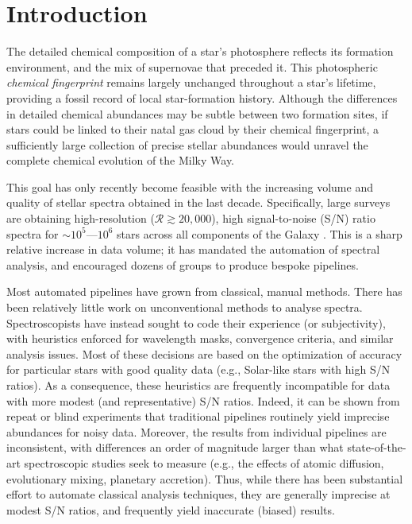 \documentclass[12pt,preprint]{aastex}
\begin{document}
\section{Introduction}
The detailed chemical composition of a star's photosphere reflects its
 formation environment, and the mix of supernovae that 
preceded it.  This photospheric \emph{chemical fingerprint} remains largely
unchanged throughout a star's lifetime, providing a fossil record of 
local star-formation history.  Although the differences in detailed chemical
abundances may be subtle between two formation sites, if stars could be linked
to their natal gas cloud by their chemical fingerprint, a sufficiently large
collection of precise stellar abundances would unravel the
complete chemical evolution of the Milky Way. 


This goal has only recently become feasible with the increasing volume and 
quality of stellar spectra obtained in the last decade.  Specifically, large 
surveys are obtaining high-resolution ($\mathcal{R} \gtrsim 20,000$), high 
signal-to-noise (S/N) ratio spectra for $\sim10^5$---$10^6$ stars across all 
components of the Galaxy \citep{Gilmore_2012,Zasowski_2013,De_Silva_2015}.  This is a sharp relative increase in data volume; it has mandated the automation of spectral analysis, and encouraged dozens of
groups to produce bespoke pipelines.



Most automated pipelines have grown from classical, manual methods.  There has 
been relatively little work on unconventional methods to analyse spectra.  
Spectroscopists have instead sought to code their experience (or subjectivity), 
with heuristics enforced for wavelength masks, convergence criteria, 
and similar analysis issues.  Most of these decisions are based on the optimization of accuracy for particular stars with good quality data (e.g., Solar-like
stars with high S/N ratios).  As a consequence, these heuristics are frequently 
incompatible for data with more modest (and representative) S/N ratios.  Indeed, 
it can be shown from repeat or blind experiments that traditional pipelines 
routinely yield imprecise abundances for noisy data.  Moreover, the results from individual 
pipelines are inconsistent, with differences an order of 
magnitude larger than what state-of-the-art spectroscopic studies seek to 
measure (e.g., the effects of atomic diffusion, evolutionary mixing, planetary
accretion).  Thus, while there has been substantial effort to automate
classical analysis techniques, they are generally imprecise at modest S/N 
ratios, and frequently yield inaccurate (biased) results.
\end{document}
